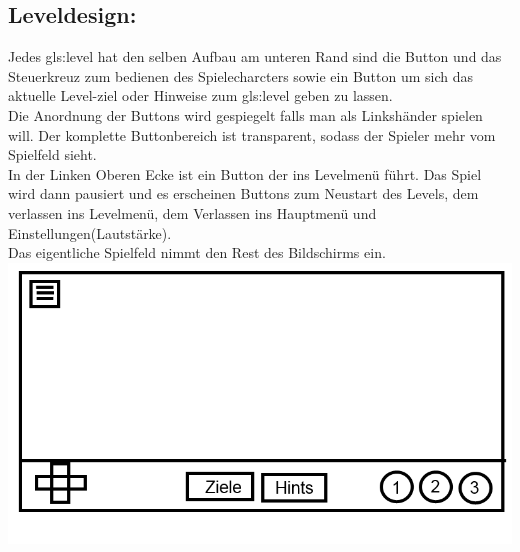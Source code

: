 \documentclass{scrartcl}
\begin{document}
\begin{enumerate}
	\begin{minipage}{1\textwidth}
		\item \subsection*{Leveldesign:} \label{appaufbau:Leveldesign}
		Jedes \gls{gls:level}  hat den selben Aufbau am unteren Rand sind die Button und das Steuerkreuz zum bedienen des Spielecharcters sowie ein Button um sich das aktuelle Level-ziel oder Hinweise zum \gls{gls:level} geben zu lassen.\\ Die Anordnung der Buttons wird gespiegelt falls man als Linkshänder spielen will. Der komplette Buttonbereich ist transparent, sodass der Spieler mehr vom Spielfeld sieht.\\
		In der Linken Oberen Ecke ist ein Button der ins Levelmenü führt. Das Spiel wird dann pausiert und es erscheinen Buttons zum Neustart des Levels, dem verlassen ins Levelmenü, dem Verlassen ins Hauptmenü und Einstellungen(Lautstärke).\\
		Das eigentliche Spielfeld nimmt den Rest des Bildschirms ein.\\
		\includegraphics[scale=0.5]{assets/LevelDesign2}
	\end{minipage}
	

\end{enumerate}
\end{document}
